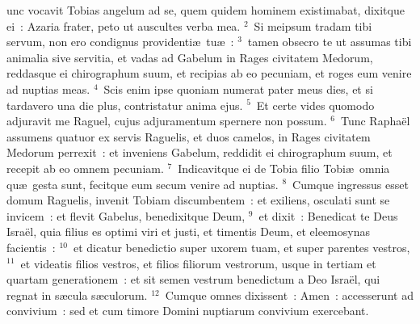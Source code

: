 \bchapter
{}unc vocavit Tobias angelum ad se, quem quidem hominem existimabat, dixitque ei~: Azaria frater, peto ut auscultes verba mea.
${}^{2}$~Si meipsum tradam tibi servum, non ero condignus providenti\ae\ tu\ae~:
${}^{3}$~tamen obsecro te ut assumas tibi animalia sive servitia, et vadas ad Gabelum in Rages civitatem Medorum, reddasque ei chirographum suum, et recipias ab eo pecuniam, et roges eum venire ad nuptias meas.
${}^{4}$~Scis enim ipse quoniam numerat pater meus dies, et si tardavero una die plus, contristatur anima ejus.
${}^{5}$~Et certe vides quomodo adjuravit me Raguel, cujus adjuramentum spernere non possum.
${}^{6}$~Tunc Rapha\"el assumens quatuor ex servis Raguelis, et duos camelos, in Rages civitatem Medorum perrexit~: et inveniens Gabelum, reddidit ei chirographum suum, et recepit ab eo omnem pecuniam.
${}^{7}$~Indicavitque ei de Tobia filio Tobi\ae\ omnia qu\ae\ gesta sunt, fecitque eum secum venire ad nuptias.
${}^{8}$~Cumque ingressus esset domum Raguelis, invenit Tobiam discumbentem~: et exiliens, osculati sunt se invicem~: et flevit Gabelus, benedixitque Deum,
${}^{9}$~et dixit~: Benedicat te Deus Isra\"el, quia filius es optimi viri et justi, et timentis Deum, et eleemosynas facientis~:
${}^{10}$~et dicatur benedictio super uxorem tuam, et super parentes vestros,
${}^{11}$~et videatis filios vestros, et filios filiorum vestrorum, usque in tertiam et quartam generationem~: et sit semen vestrum benedictum a Deo Isra\"el, qui regnat in s\ae cula s\ae culorum.
${}^{12}$~Cumque omnes dixissent~: Amen~: accesserunt ad convivium~: sed et cum timore Domini nuptiarum convivium exercebant.

